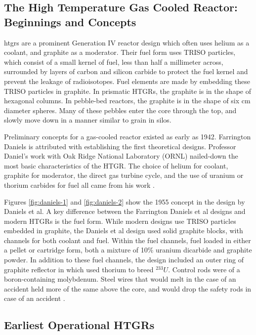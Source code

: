 \subsection{The High Temperature Gas Cooled Reactor: Beginnings and Concepts}

\acrshort{htgr}s are a prominent Generation IV reactor design which often uses helium as a coolant, and graphite as a moderator.  Their fuel form uses TRISO particles, which consist of a small kernel of fuel, less than half a millimeter across, surrounded by layers of carbon and silicon carbide to protect the fuel kernel and prevent the leakage of radioisotopes.  Fuel elements are made by embedding these TRISO particles in graphite.  In prismatic HTGRs, the graphite is in the shape of hexagonal columns.  In pebble-bed reactors, the graphite is in the shape of six cm diameter spheres.  Many of these pebbles enter the core through the top, and slowly move down in a manner similar to grain in silos.

Preliminary concepts for a gas-cooled reactor existed as early as 1942.  Farrington Daniels is attributed with establishing the first theoretical designs.  Professor Daniel's work with Oak Ridge National Laboratory (ORNL) nailed-down the most basic characteristics of the HTGR.  The choice of helium for coolant, graphite for moderator, the direct gas turbine cycle, and the use of uranium or thorium carbides for fuel all came from his work \cite{simnad_early_1991}.




Figures \ref{fig:daniels-1} and \ref{fig:daniels-2} show the 1955 concept in the design by Daniels et al.  A key difference between the Farrington Daniels et al designs and modern HTGRs is the fuel form.  While modern designs use TRISO particles embedded in graphite, the Daniels et al design used solid graphite blocks, with channels for both coolant and fuel.  Within the fuel channels, fuel loaded in either a pellet or cartridge form, both a mixture of 10$\%$ uranium dicarbide and graphite powder.  In addition to these fuel channels, the design included an outer ring of graphite reflector in which used thorium to breed $^{233}U$.  Control rods were of a boron-containing molybdenum.  Steel wires that would melt in the case of an accident held more of the same above the core, and would drop the safety rods in case of an accident \cite{simnad_early_1991}.

\subsection{Earliest Operational HTGRs}

